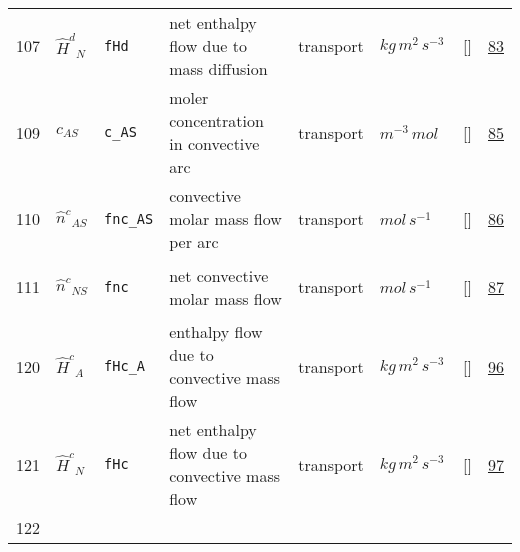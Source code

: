 \begin{longtable}{|p{1cm}|p{3cm}|p{3cm}|p{7cm}|p{3.0cm}|p{3cm}|p{2cm}|p{1cm}|}
    107
             & \hypertarget{"v:107"}{ $ {\hat{H}^d}{_{N}} $}
             & \verb|fHd|
             & net enthalpy flow due to mass diffusion
             & \begin{lay}transport \end{lay}
             & $ kg \,m^{2} \,s^{-3} \, $
             & []
             & \hyperlink{"e:83"}{ 83 }
                 \\
    109
             & \hypertarget{"v:109"}{ $ {c}{_{{A S}}} $}
             & \verb|c_AS|
             & moler concentration in convective arc
             & \begin{lay}transport \end{lay}
             & $ m^{-3} \,mol \, $
             & []
             & \hyperlink{"e:85"}{ 85 }
                 \\
    110
             & \hypertarget{"v:110"}{ $ {\hat{n}^c}{_{{A S}}} $}
             & \verb|fnc_AS|
             & convective molar mass flow per arc
             & \begin{lay}transport \end{lay}
             & $ mol \,s^{-1} \, $
             & []
             & \hyperlink{"e:86"}{ 86 }
                 \\
    111
             & \hypertarget{"v:111"}{ $ {\hat{n}^c}{_{{N S}}} $}
             & \verb|fnc|
             & net convective molar mass flow
             & \begin{lay}transport \end{lay}
             & $ mol \,s^{-1} \, $
             & []
             & \hyperlink{"e:87"}{ 87 }
                 \\
    120
             & \hypertarget{"v:120"}{ $ {\hat{H}^c}{_{A}} $}
             & \verb|fHc_A|
             & enthalpy flow due to convective mass flow
             & \begin{lay}transport \end{lay}
             & $ kg \,m^{2} \,s^{-3} \, $
             & []
             & \hyperlink{"e:96"}{ 96 }
                 \\
    121
             & \hypertarget{"v:121"}{ $ {\hat{H}^c}{_{N}} $}
             & \verb|fHc|
             & net enthalpy flow due to convective mass flow
             & \begin{lay}transport \end{lay}
             & $ kg \,m^{2} \,s^{-3} \, $
             & []
             & \hyperlink{"e:97"}{ 97 }
                 \\
    122

\end{longtable}
